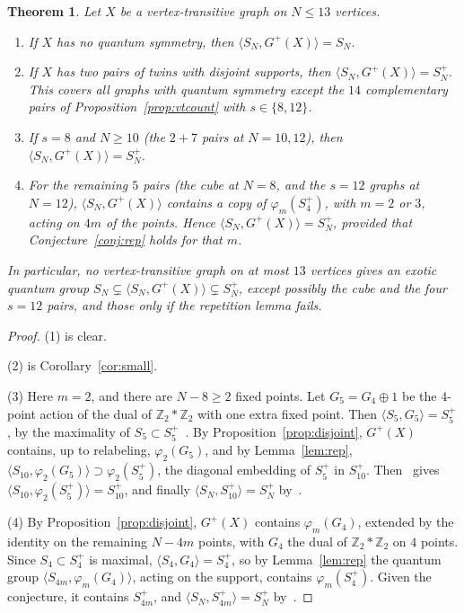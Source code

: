 \documentclass[11pt]{amsart}
\newtheorem{theorem}{Theorem}[section]
\theoremstyle{definition}
\theoremstyle{remark}
\theoremstyle{plain}
\numberwithin{equation}{section}
\numberwithin{table}{section}
\newcommand{\Z}{\mathbb Z}
\begin{document}
\begin{theorem}\label{thm:vt}
Let $X$ be a vertex-transitive graph on $N\le13$ vertices.
\begin{enumerate}
\item If $X$ has no quantum symmetry, then $\langle S_N,G^+(X)\rangle=S_N$.
\item If $X$ has two pairs of twins with disjoint supports, then $\langle S_N,G^+(X)\rangle=S_N^+$. This covers all graphs with quantum symmetry except the $14$ complementary pairs of Proposition~\ref{prop:vtcount} with $s\in\{8,12\}$.
\item If $s=8$ and $N\ge10$ (the $2+7$ pairs at $N=10,12$), then $\langle S_N,G^+(X)\rangle=S_N^+$.
\item For the remaining $5$ pairs (the cube at $N=8$, and the $s=12$ graphs at $N=12$), $\langle S_N,G^+(X)\rangle$ contains a copy of $\varphi_m(S_4^+)$, with $m=2$ or $3$, acting on $4m$ of the points. Hence $\langle S_N,G^+(X)\rangle=S_N^+$, provided that Conjecture~\ref{conj:rep} holds for that $m$.
\end{enumerate}
In particular, no vertex-transitive graph on at most $13$ vertices gives an exotic quantum group $S_N\subsetneq\langle S_N,G^+(X)\rangle\subsetneq S_N^+$, except possibly the cube and the four $s=12$ pairs, and those only if the repetition lemma fails.
\end{theorem}

\begin{proof}
(1) is clear.

(2) is Corollary~\ref{cor:small}.

(3) Here $m=2$, and there are $N-8\ge2$ fixed points. Let $G_5=G_4\oplus1$ be the $4$-point action of the dual of $\Z_2*\Z_2$ with one extra fixed point. Then $\langle S_5,G_5\rangle=S_5^+$, by the maximality of $S_5\subset S_5^+$~\cite{bah}. By Proposition~\ref{prop:disjoint}, $G^+(X)$ contains, up to relabeling, $\varphi_2(G_5)$, and by Lemma~\ref{lem:rep}, $\langle S_{10},\varphi_2(G_5)\rangle\supset\varphi_2(S_5^+)$, the diagonal embedding of $S_5^+$ in $S_{10}^+$. Then~\cite[Prop.~3.10 and Ex.~3.9]{bcf} gives $\langle S_{10},\varphi_2(S_5^+)\rangle=S_{10}^+$, and finally $\langle S_N,S_{10}^+\rangle=S_N^+$ by~\cite[Cor.~3.4]{bcf}.

(4) By Proposition~\ref{prop:disjoint}, $G^+(X)$ contains $\varphi_m(G_4)$, extended by the identity on the remaining $N-4m$ points, with $G_4$ the dual of $\Z_2*\Z_2$ on $4$ points. Since $S_4\subset S_4^+$ is maximal, $\langle S_4,G_4\rangle=S_4^+$, so by Lemma~\ref{lem:rep} the quantum group $\langle S_{4m},\varphi_m(G_4)\rangle$, acting on the support, contains $\varphi_m(S_4^+)$. Given the conjecture, it contains $S_{4m}^+$, and $\langle S_N,S_{4m}^+\rangle=S_N^+$ by~\cite[Cor.~3.4]{bcf}.
\end{proof}
\end{document}
